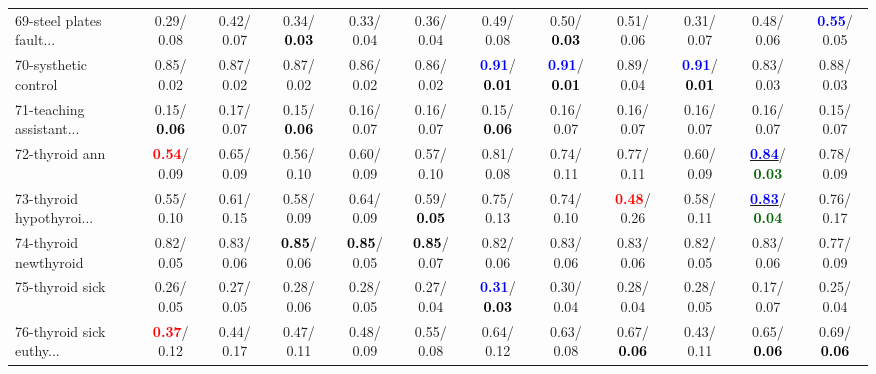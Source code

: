 \begin{table}[h]
\begin{center}
{\begin{tabular}{lc|c|c|c|c|c|c|c|c|c|c}
69-steel plates fault... &   0.29/  0.08 &   0.42/  0.07 &   0.34/\textcolor{black}{\textbf{  0.03}} &   0.33/  0.04 &   0.36/  0.04 &   0.49/  0.08 &   0.50/\textcolor{black}{\textbf{  0.03}} &   0.51/  0.06 &   0.31/  0.07 &   0.48/  0.06 & \textcolor{blue}{\textbf{  0.55}}/  0.05 \\
70-systhetic control &   0.85/  0.02 &   0.87/  0.02 &   0.87/  0.02 &   0.86/  0.02 &   0.86/  0.02 & \textcolor{blue}{\textbf{  0.91}}/\textcolor{black}{\textbf{  0.01}} & \textcolor{blue}{\textbf{  0.91}}/\textcolor{black}{\textbf{  0.01}} &   0.89/  0.04 & \textcolor{blue}{\textbf{  0.91}}/\textcolor{black}{\textbf{  0.01}} &   0.83/  0.03 &   0.88/  0.03 \\
71-teaching assistant... &   0.15/\textcolor{black}{\textbf{  0.06}} &   0.17/  0.07 &   0.15/\textcolor{black}{\textbf{  0.06}} &   0.16/  0.07 &   0.16/  0.07 &   0.15/\textcolor{black}{\textbf{  0.06}} &   0.16/  0.07 &   0.16/  0.07 &   0.16/  0.07 &   0.16/  0.07 &   0.15/  0.07 \\ \hline
72-thyroid ann & \textcolor{red}{\textbf{  0.54}}/  0.09 &   0.65/  0.09 &   0.56/  0.10 &   0.60/  0.09 &   0.57/  0.10 &   0.81/  0.08 &   0.74/  0.11 &   0.77/  0.11 &   0.60/  0.09 & \underline{\textcolor{blue}{\textbf{  0.84}}}/\textcolor{darkgreen}{\textbf{  0.03}} &   0.78/  0.09 \\
73-thyroid hypothyroi... &   0.55/  0.10 &   0.61/  0.15 &   0.58/  0.09 &   0.64/  0.09 &   0.59/\textcolor{black}{\textbf{  0.05}} &   0.75/  0.13 &   0.74/  0.10 & \textcolor{red}{\textbf{  0.48}}/  0.26 &   0.58/  0.11 & \underline{\textcolor{blue}{\textbf{  0.83}}}/\textcolor{darkgreen}{\textbf{  0.04}} &   0.76/  0.17 \\
74-thyroid newthyroid &   0.82/  0.05 &   0.83/  0.06 & \textcolor{black}{\textbf{  0.85}}/  0.06 & \textcolor{black}{\textbf{  0.85}}/  0.05 & \textcolor{black}{\textbf{  0.85}}/  0.07 &   0.82/  0.06 &   0.83/  0.06 &   0.83/  0.06 &   0.82/  0.05 &   0.83/  0.06 &   0.77/  0.09 \\
75-thyroid sick &   0.26/  0.05 &   0.27/  0.05 &   0.28/  0.06 &   0.28/  0.05 &   0.27/  0.04 & \textcolor{blue}{\textbf{  0.31}}/\textcolor{black}{\textbf{  0.03}} &   0.30/  0.04 &   0.28/  0.04 &   0.28/  0.05 &   0.17/  0.07 &   0.25/  0.04 \\
76-thyroid sick euthy... & \textcolor{red}{\textbf{  0.37}}/  0.12 &   0.44/  0.17 &   0.47/  0.11 &   0.48/  0.09 &   0.55/  0.08 &   0.64/  0.12 &   0.63/  0.08 &   0.67/\textcolor{black}{\textbf{  0.06}} &   0.43/  0.11 &   0.65/\textcolor{black}{\textbf{  0.06}} &   0.69/\textcolor{black}{\textbf{  0.06}} \\

\end{tabular}}
\end{center}
\end{table}
